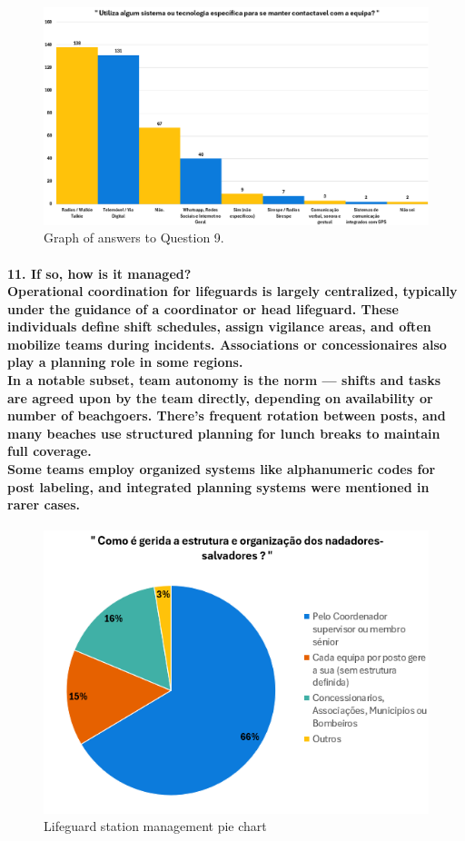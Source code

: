 \begin{figure}[H]
      \centering
      \includegraphics[width=16cm]{figs/questiongraf/image8.png}
      \caption{Graph of answers to Question 9.}
      \label{fig:question8}
\end{figure}

\paragraph{
\textbf{11. If so, how is it managed?}
\\
Operational coordination for lifeguards is largely centralized, typically under the guidance of a coordinator or head lifeguard. These individuals define shift schedules, assign vigilance areas, and often mobilize teams during incidents. Associations or concessionaires also play a planning role in some regions.
\\
In a notable subset, team autonomy is the norm — shifts and tasks are agreed upon by the team directly, depending on availability or number of beachgoers. There’s frequent rotation between posts, and many beaches use structured planning for lunch breaks to maintain full coverage.
\\
Some teams employ organized systems like alphanumeric codes for post labeling, and integrated planning systems were mentioned in rarer cases.}

\begin{figure}[H]
      \centering
      \includegraphics[width=16cm]{figs/questiongraf/image9.png}
      \caption{Lifeguard station management pie chart}
      \label{fig:question10}
\end{figure}

